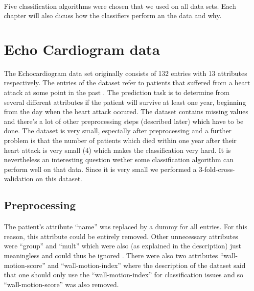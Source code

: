\documentclass[paper=a4, fontsize=11pt]{scrartcl} %
\numberwithin{equation}{section} %
\numberwithin{figure}{section} %
\numberwithin{table}{section} %
\begin{document}
\paragraph{}Five classification algorithms were chosen that we used on all data sets. Each chapter will also dicuss how the classifiers perform an the data and why.




\section{Echo Cardiogram data}

\paragraph{}The Echocardiogram data set originally consists of 132 entries with 13 attributes respectively. The entries of the dataset refer to patients that suffered from a heart attack at some point in the past \cite{uci-repo}. The prediction task is to determine from several different attributes if the patient will survive at least one year, beginning from the day when the heart attack occured. The dataset contains missing values and there's a lot of other preprocessing steps (described later) which have to be done. The dataset is very small, especially after preprocessing and a further problem is that the number of patients which died within one year after their heart attack is very small (4) which makes the classification very hard. It is nevertheless an interesting question wether some classification algorithm can perform well on that data. Since it is very small we performed a 3-fold-cross-validation on this dataset.

\subsection{Preprocessing}
\paragraph{}The patient's attribute ``name'' was replaced by a dummy for all entries. For this reason, this attribute could be entirely removed. Other unnecessary attributes were ``group'' and ``mult'' which were also (as explained in the description) just meaningless and could thus be ignored \cite{uci-repo}. There were also two attributes ``wall-motion-score'' and ``wall-motion-index'' where the description of the dataset said that one should only use the ``wall-motion-index'' for classification issues and so ``wall-motion-score'' was also removed.
\end{document}
